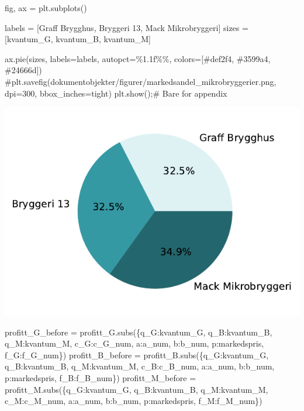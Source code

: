 \documentclass[
  12pt,
  a4paper,
  DIV=11,
  numbers=noendperiod]{scrartcl}
\newenvironment{Shaded}{\begin{snugshade}}{\end{snugshade}}
\newcommand{\CommentTok}[1]{\textcolor[rgb]{0.37,0.37,0.37}{#1}}
\newcommand{\NormalTok}[1]{\textcolor[rgb]{0.00,0.23,0.31}{#1}}
\newcommand{\OperatorTok}[1]{\textcolor[rgb]{0.37,0.37,0.37}{#1}}
\newcommand{\SpecialCharTok}[1]{\textcolor[rgb]{0.37,0.37,0.37}{#1}}
\newcommand{\StringTok}[1]{\textcolor[rgb]{0.13,0.47,0.30}{#1}}
\begin{document}
\begin{Shaded}
\begin{Highlighting}[]
\NormalTok{fig, ax }\OperatorTok{=}\NormalTok{ plt.subplots()}

\NormalTok{labels }\OperatorTok{=}\NormalTok{ [}\StringTok{\textquotesingle{}Graff Brygghus\textquotesingle{}}\NormalTok{, }\StringTok{\textquotesingle{}Bryggeri 13\textquotesingle{}}\NormalTok{, }\StringTok{\textquotesingle{}Mack Mikrobryggeri\textquotesingle{}}\NormalTok{]}
\NormalTok{sizes }\OperatorTok{=}\NormalTok{ [kvantum\_G, kvantum\_B, kvantum\_M]}

\NormalTok{ax.pie(sizes, labels}\OperatorTok{=}\NormalTok{labels, autopct}\OperatorTok{=}\StringTok{\textquotesingle{}}\SpecialCharTok{\%1.1f\%\%}\StringTok{\textquotesingle{}}\NormalTok{, colors}\OperatorTok{=}\NormalTok{[}\StringTok{\textquotesingle{}\#def2f4\textquotesingle{}}\NormalTok{, }\StringTok{\textquotesingle{}\#3599a4\textquotesingle{}}\NormalTok{, }\StringTok{\textquotesingle{}\#24666d\textquotesingle{}}\NormalTok{])}
\CommentTok{\#plt.savefig(\textquotesingle{}dokumentobjekter/figurer/markedsandel\_mikrobryggerier.png\textquotesingle{}, dpi=300, bbox\_inches=\textquotesingle{}tight\textquotesingle{})}
\NormalTok{plt.show()}\OperatorTok{;}\CommentTok{\# Bare for appendix}
\end{Highlighting}
\end{Shaded}

\includegraphics{18_SOK2030_mappeoppgave_2_V24_files/figure-pdf/cell-31-output-1.pdf}

\begin{Shaded}
\begin{Highlighting}[]
\NormalTok{profitt\_G\_before }\OperatorTok{=}\NormalTok{ profitt\_G.subs(\{q\_G:kvantum\_G, q\_B:kvantum\_B, q\_M:kvantum\_M, c\_G:c\_G\_num, a:a\_num, b:b\_num, p:markedspris, f\_G:f\_G\_num\})}
\NormalTok{profitt\_B\_before }\OperatorTok{=}\NormalTok{ profitt\_B.subs(\{q\_G:kvantum\_G, q\_B:kvantum\_B, q\_M:kvantum\_M, c\_B:c\_B\_num, a:a\_num, b:b\_num, p:markedspris, f\_B:f\_B\_num\})}
\NormalTok{profitt\_M\_before }\OperatorTok{=}\NormalTok{ profitt\_M.subs(\{q\_G:kvantum\_G, q\_B:kvantum\_B, q\_M:kvantum\_M, c\_M:c\_M\_num, a:a\_num, b:b\_num, p:markedspris, f\_M:f\_M\_num\})}
\end{Highlighting}
\end{Shaded}
\end{document}
